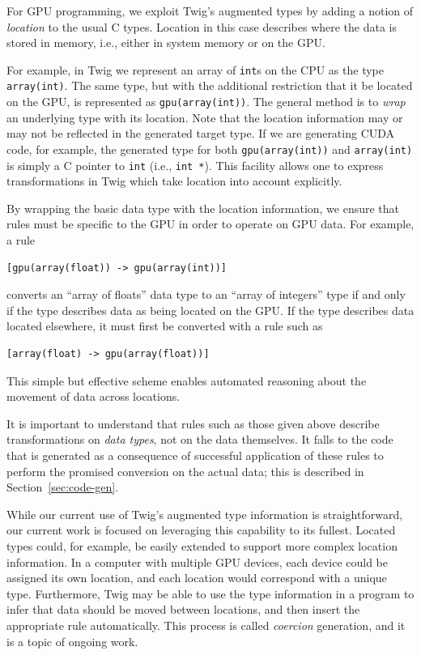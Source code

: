For GPU programming, we exploit Twig's augmented types by adding a notion of \emph{location} to the usual C types. Location in this case describes where the data is stored in memory, i.e., either in system memory or on the GPU.

For example, in Twig we represent an array of \texttt{int}s on the CPU as the type \texttt{array(int)}. The same type, but with the additional restriction that it be located on the GPU, is represented as \texttt{gpu(array(int))}. The general method is to \emph{wrap} an underlying type with its location. Note that the location information may or may not be reflected in the generated target type. If we are generating CUDA code, for example, the generated type for both \texttt{gpu(array(int))} and \texttt{array(int)} is simply a C pointer to \texttt{int} (i.e., \texttt{int *}). This facility allows one to express transformations in Twig which take location into account explicitly.

By wrapping the basic data type with the location information, we ensure that rules must be specific to the GPU in order to operate on GPU data. For example, a rule

\begin{verbatim}
[gpu(array(float)) -> gpu(array(int))]
\end{verbatim}

converts an ``array of floats'' data type to an ``array of integers'' type if and only if the type describes data as being located on the GPU. If the type describes data located elsewhere, it must first be converted with a rule such as

\begin{verbatim}
[array(float) -> gpu(array(float))]
\end{verbatim}

This simple but effective scheme enables automated reasoning about the movement of data across locations.

It is important to understand that rules such as those given above describe transformations on \emph{data types}, not on the data themselves. It falls to the code that is generated as a consequence of successful application of these rules to perform the promised conversion on the actual data; this is described in Section~\ref{sec:code-gen}.

While our current use of Twig's augmented type information is straightforward, our current work is focused on leveraging this capability to its fullest. Located types could, for example, be easily extended to support more complex location information. In a computer with multiple GPU devices, each device could be assigned its own location, and each location would correspond with a unique type. Furthermore, Twig may be able to use the type information in a program to infer that data should be moved between locations, and then insert the appropriate rule automatically. This process is called \emph{coercion} generation, and it is a topic of ongoing work.
